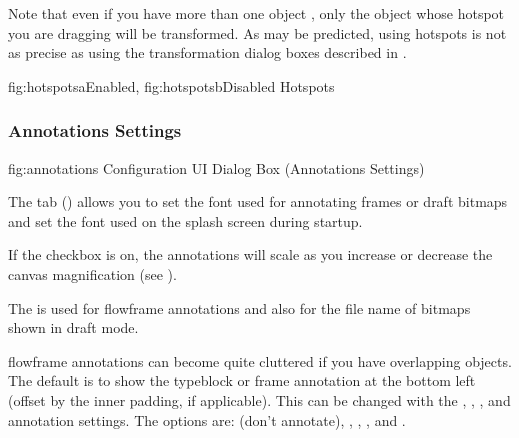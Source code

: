 Note that even if you have more than one \gls{object} \selected, only the
object whose \gls{hotspot} you are dragging will be transformed.
As may be predicted, using \glspl{hotspot} is not as precise as using the
transformation dialog boxes described in
.

{
 {fig:hotspotsa}{}{Enabled},
 {fig:hotspotsb}{}{Disabled}
}
{Hotspots}


\subsubsection{Annotations Settings}\label{sec:annotations}


\FloatFig
  {fig:annotations}
  {}
  {Configuration UI Dialog Box (Annotations Settings)}

The  tab ()
allows you to set the font used for annotating frames or draft
\glspl{bitmap} and set the font used on the splash screen during startup.


If the  checkbox is on, the annotations will scale as you
increase or decrease the \gls{canvas} magnification 
(see ).

The  is used for \gls{flowframe}
annotations and also for the file name of \glspl{bitmap} shown in draft
mode.

\Gls{flowframe} annotations can become quite cluttered if you have overlapping
\glspl{object}. The default is to show the \gls{typeblock} or frame
annotation at the bottom left (offset by the inner padding, if
applicable). This can be changed with the
,
,
, and
annotation settings. The options are:
 (don't annotate),
,
,
, and
.

